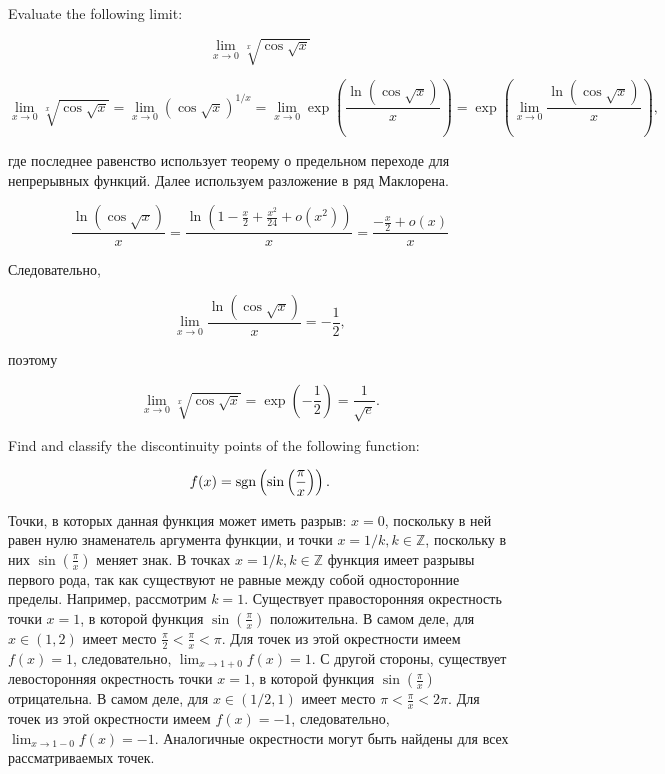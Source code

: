 \documentclass[addpoints, answers]{exam} %
\DeclareMathOperator{\sgn}{\rm sgn}
\begin{document}
\begin{questions}

\question[10] Evaluate the following limit:

\[
\lim_{x \to 0} \sqrt[x]{\cos \sqrt{x}}
\]

\begin{solution}

\[
\lim_{x \rightarrow 0} \sqrt[x]{\cos \sqrt{x}} = \lim_{x \rightarrow 0} \left({\cos \sqrt{x}}\right) ^{1/x} =  \lim_{x \rightarrow 0} \exp
\left( \frac{\ln (\cos \sqrt{x})}{x} \right) = \exp \left( \lim_{x \rightarrow 0}
\frac{\ln (\cos \sqrt{x})}{x} \right),
\]

\noindent где последнее равенство использует теорему о предельном переходе для непрерывных функций. Далее используем разложение в ряд Маклорена.

\[
\frac{\ln (\cos \sqrt{x})}{x} = \frac{\ln (1-
\frac{x}{2}+\frac{x^2}{24}+o(x^2))}{x} = \frac{-\frac{x}{2}+o(x)}{x}
\]

\noindent Следовательно,

\[
\lim_{x \rightarrow 0} \frac{\ln (\cos \sqrt{x})}{x} = -\frac{1}{2},
\]

\noindent поэтому

\[
\lim_{x \rightarrow 0} \sqrt[x]{\cos \sqrt{x}} = \exp \left( -\frac{1}{2}\right) = \frac{1}{\sqrt{e}}.
\]
\end{solution}

\question[10] Find and classify the discontinuity points of the following function:

\[
f(x) = {\sgn} \left(\sin \left( \frac{\pi}{x}\right)\right).
\]

\begin{solution}
Точки, в которых данная функция может иметь разрыв: $x=0$, поскольку в ней равен нулю знаменатель аргумента функции, и точки $x=1/k, k \in \mathbb{Z}$, поскольку в них $\sin \left( \frac{\pi}{x}\right)$ меняет знак. В точках $x=1/k, k \in \mathbb{Z}$ функция имеет разрывы первого рода, так как существуют не равные между собой односторонние пределы. Например, рассмотрим $k=1$. Существует правосторонняя окрестность точки $x=1$, в которой функция $\sin \left( \frac{\pi}{x} \right)$ положительна. В самом деле, для $x \in (1,2)$ имеет место $\frac{\pi}{2} < \frac{\pi}{x} < \pi$. Для точек из этой окрестности имеем $f(x) = 1$, следовательно, $\lim_{x \rightarrow 1+0} f(x) = 1$. С другой стороны, существует левосторонняя окрестность точки $x=1$, в которой функция $\sin \left( \frac{\pi}{x} \right)$ отрицательна. В самом деле, для $x \in (1/2,1)$ имеет место $\pi < \frac{\pi}{x} < 2 \pi$. Для точек из этой окрестности имеем $f(x) = -1$, следовательно, $\lim_{x \rightarrow 1-0} f(x) = -1$. Аналогичные окрестности могут быть найдены для всех рассматриваемых точек.




\end{solution}
\end{questions}
\end{document}
